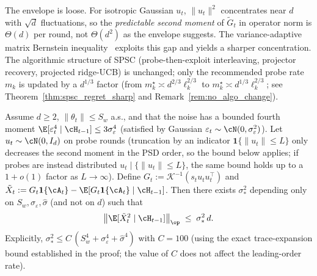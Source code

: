 The envelope is loose. For isotropic Gaussian $u_t$,
$\|u_t\|^2$ concentrates near $d$ with $\sqrt d$ fluctuations, so the
\emph{predictable second moment} of $\tilde G_t$ in operator norm is
$\Theta(d)$ per round, not $\Theta(d^2)$ as the envelope suggests.
The variance-adaptive matrix Bernstein
inequality~\citep[Theorem~7.7.1]{tropp2015introduction} exploits this
gap and yields a sharper concentration. The algorithmic structure of
SPSC (probe-then-exploit interleaving, projector recovery, projected
ridge-UCB) is unchanged; only the recommended probe rate $m_k$ is
updated by a $d^{1/3}$ factor
(from $m_k^\star\asymp d^{2/3}\ell_k^{2/3}$ to
$m_k^\star\asymp d^{1/3}\ell_k^{2/3}$; see
Theorem~\ref{thm:spsc_regret_sharp} and Remark~\ref{rem:no_algo_change}).

\begin{lemma}
\label{lem:lifted_variance}
Assume $d\ge 2$, $\|\theta_t\|\le S_w$ a.s., and that the noise has a
bounded fourth moment $\E[\varepsilon_t^4\mid\cH_{t-1}]\le 3\sigma_\varepsilon^4$
(satisfied by Gaussian $\varepsilon_t\sim\cN(0,\sigma_\varepsilon^2)$).
Let $u_t\sim\cN(0,I_d)$ on probe rounds (truncation by an indicator
$\mathbf 1\{\|u_t\|\le L\}$ only decreases the second moment in the
PSD order, so the bound below applies; if probes are instead
distributed $u_t\mid\{\|u_t\|\le L\}$, the same bound holds up to a
$1+o(1)$ factor as $L\to\infty$). Define $G_t := \mathcal K^{-1}(s_t u_t u_t^\top)$
and $\tilde X_t := G_t\mathbf 1\{\cA_t\}-\E[G_t\mathbf 1\{\cA_t\}\mid\cH_{t-1}]$.
Then there exists $\sigma_*^2$ depending only on $S_w,\sigma_\varepsilon,\hat\sigma$
(and not on $d$) such that
\begin{equation}
\bigl\|\E[\tilde X_t^2\mid\cH_{t-1}]\bigr\|_\op
\;\le\;\sigma_*^2\,d.
\label{eq:lifted_var}
\end{equation}
Explicitly, $\sigma_*^2 \le C\,(S_w^4 + \sigma_\varepsilon^4 + \hat\sigma^4)$
with $C=100$ (using the exact trace-expansion bound established in the
proof; the value of $C$ does not affect the leading-order rate).
\end{lemma}
